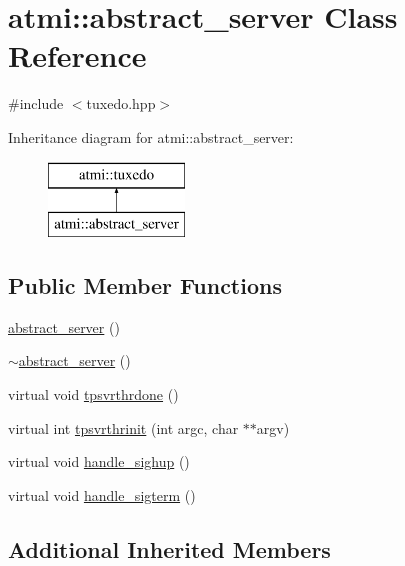 \hypertarget{classatmi_1_1abstract__server}{\section{atmi\+:\+:abstract\+\_\+server Class Reference}
\label{classatmi_1_1abstract__server}
}


{\ttfamily \#include $<$tuxedo.\+hpp$>$}

Inheritance diagram for atmi\+:\+:abstract\+\_\+server\+:\begin{figure}[H]
\begin{center}
\leavevmode
\includegraphics[height=2.000000cm]{classatmi_1_1abstract__server}
\end{center}
\end{figure}
\subsection*{Public Member Functions}
\begin{DoxyCompactItemize}
\item 
\hyperlink{classatmi_1_1abstract__server_ae8379cb3f00991fa5459f02d106f45de}{abstract\+\_\+server} ()
\item 
\hyperlink{classatmi_1_1abstract__server_a2a69000edc58c8111234060ea0bc330e}{$\sim$abstract\+\_\+server} ()
\item 
virtual void \hyperlink{classatmi_1_1abstract__server_ad839be63bae91afe4b5f4e090cd8e8c5}{tpsvrthrdone} ()
\item 
virtual int \hyperlink{classatmi_1_1abstract__server_a08dec6ac0346262a7364e3f6a9657016}{tpsvrthrinit} (int argc, char $\ast$$\ast$argv)
\item 
virtual void \hyperlink{classatmi_1_1abstract__server_a6ba22ce07e663a18c50e26e0bf3d1c02}{handle\+\_\+sighup} ()
\item 
virtual void \hyperlink{classatmi_1_1abstract__server_adb56df1eb235255585c3719e246bd4f3}{handle\+\_\+sigterm} ()
\end{DoxyCompactItemize}
\subsection*{Additional Inherited Members}



